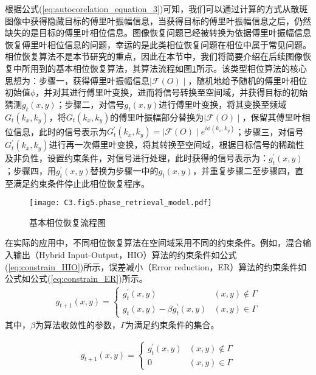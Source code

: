 根据公式(\ref{eq:autocorelation_equation_3})可知，我们可以通过计算的方式从散斑图像中获得隐藏目标的傅里叶振幅信息，当获得目标的傅里叶振幅信息之后，仍然缺失的是目标的傅里叶相位信息。图像恢复问题已经被转换为依据傅里叶振幅信息恢复傅里叶相位信息的问题，幸运的是此类相位恢复问题在相位中属于常见问题。相位恢复算法不是本节研究的重点，因此在本节中，我们将简要介绍在后续图像恢复中所用到的基本相位恢复算法，其算法流程如图\ref{fig:3.5}所示。该类型相位算法的核心思想为：步骤一，获得傅里叶振幅信息$\mid \mathcal{F}(O) \mid$，随机地给予随机的傅里叶相位初始值$\phi$，并对其进行傅里叶变换，进而将信号转换至空间域，并获得目标的初始猜测$g_t(x,y)$；步骤二，对信号$g_t(x,y)$进行傅里叶变换，将其变换至频域$G_t(k_x,k_y)$，将$G_t(k_x,k_y)$的傅里叶振幅部分替换为$\mid \mathcal{F}(O) \mid$，保留其傅里叶相位信息，此时的信号表示为$G^{\prime}_t(k_x,k_y) =\mid \mathcal{F}(O) \mid e^{i\phi (k_x,k_y)}$；步骤三，对信号$G^{\prime}_t(k_x,k_y)$进行再一次傅里叶变换，将其转换至空间域，根据目标信号的稀疏性及非负性，设置约束条件，对信号进行处理，此时获得的信号表示为：$g^{\prime}_t(x,y)$；步骤四，用$g^{\prime}_t(x,y)$替换为步骤一中的$g_t(x,y)$，并重复步骤二至步骤四，直至满足约束条件停止此相位恢复程序。

\begin{figure}[htp]
	\centering
	\texttt{[image: C3.fig5.phase\_retrieval\_model.pdf]}
	\caption{基本相位恢复流程图}
	\label{fig:3.5}
\end{figure}
在实际的应用中，不同相位恢复算法在空间域采用不同的约束条件。例如，混合输入输出（Hybrid Input-Output，HIO）算法的约束条件如公式(\ref{eq:constrain_HIO})所示，误差减小（Error reduction，ER）算法的约束条件如公式如公式(\ref{eq:constrain_ER})所示。
\begin{equation}
\begin{aligned}
 g_{t+1}(x,y) =
		  \begin{cases}
		    g_{t}^{\prime}(x,y)   &   (x,y)\notin\Gamma\\
		    g_{t}(x,y)-\beta g_{t}^{\prime}(x,y) & (x,y)\in\Gamma
		  \end{cases}
\end{aligned}
\label{eq:constrain_ER}
\end{equation}
其中，$\beta$为算法收敛性的参数，$\Gamma$为满足约束条件的集合。

\begin{equation}
\begin{aligned}
 g_{t+1}(x,y) =
		  \begin{cases}
		    g_{t}^{\prime}(x,y)   &   (x,y)\notin\Gamma\\
		    0  & (x,y)\in\Gamma
		  \end{cases}
\end{aligned}
\label{eq:constrain_HIO}
\end{equation}

